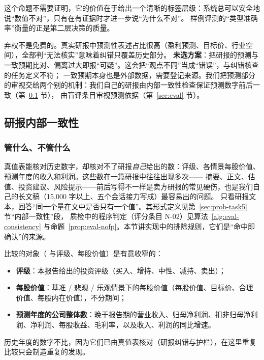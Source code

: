 这个命题不需要证明，它的价值在于给出一个清晰的标签层级：系统总可以安全地说“数值不对”，只有在有证据时才进一步说“为什么不对”。
样例评测的“类型准确率”衡量的正是第二层决策的质量。

\begin{tradeoff}[：弃权的代价]
弃权不是免费的。真实研报中预测性表述占比很高（盈利预测、目标价、行业空间），全部判“无法核实”意味着纠错只覆盖历史部分。
\textbf{未选方案}：把研报的预测与一致预期比对、偏离过大即报“可疑”。这会把“观点不同”当成“错误”，与纠错核查的任务定义不符；
一致预期本身也是外部数据，需要登记来源。我们把预测部分的审视交给两个别的机制：我们自己的研报由内部一致性检查保证预测数字前后一致（第~\ref{sec:rc-consistency} 节），
由盲评条目审视预测依据（第~\ref{sec:eval} 节）。
\end{tradeoff}

\subsection{研报内部一致性}
\label{sec:rc-consistency}

\subsubsection{管什么、不管什么}

真值表能核对历史数字，却核对不了研报\emph{自己}给出的数：评级、各情景每股价值、预测年度的收入和利润。这些数在一篇研报中往往出现多次——
摘要、正文、估值、投资建议、风险提示——前后写得不一样是卖方研报的常见硬伤，也是我们自己的长文稿（15,000 字以上、五个会话接力写成）最容易出的问题。
 只看研报文本，回答“同一个量在文中是否只有一个值”。其形式定义见第~\ref{sec:prob-task5} 节“内部一致性”段，
质检中的程序判定（评分条目 N-02）见算法~\ref{alg:eval-consistency} 与命题~\ref{prop:eval-nofp}。本节讲实现中的排除规则，它们是“命中即确认”的来源。

比较的对象（ 与评级、每股价值）是有意收窄的：
\begin{itemize}
\item \textbf{评级}：本报告给出的投资评级（买入、增持、中性、减持、卖出）；
\item \textbf{每股价值}：基准 / 悲观 / 乐观情景下的每股价值（每股价值、目标价、合理价值、每股内在价值），不分期间；
\item \textbf{预测年度的公司整体数}：晚于报告期的营业收入、归母净利润、扣非归母净利润、净利润、每股收益、毛利率，以及收入、利润的同比增速。
\end{itemize}
历史年度的数字不比，因为它们已由真值表核对（研报纠错与护栏），在这里重复比较只会制造重复的发现。

